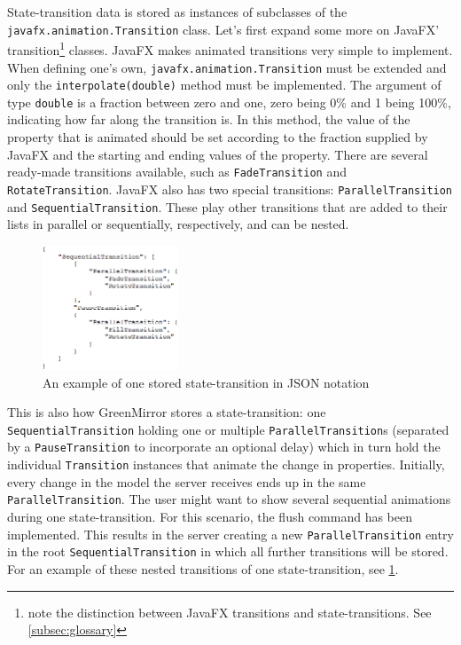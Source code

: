 \documentclass[a4paper]{article}
\begin{document}
State-transition data is stored as instances of subclasses of the \lstinline{javafx.animation.Transition} class. Let's first expand some more on JavaFX' transition\footnote{note the distinction between JavaFX transitions and state-transitions. See \cref{subsec:glossary}} classes. JavaFX makes animated transitions very simple to implement. When defining one's own, \lstinline{javafx.animation.Transition} must be extended and only the \lstinline{interpolate(double)} method must be implemented. The argument of type \lstinline{double} is a fraction between zero and one, zero being 0\% and 1 being 100\%, indicating how far along the transition is. In this method, the value of the property that is animated should be set according to the fraction supplied by JavaFX and the starting and ending values of the property. There are several ready-made transitions available, such as \lstinline{FadeTransition} and \lstinline{RotateTransition}. JavaFX also has two special transitions: \lstinline{ParallelTransition} and \lstinline{SequentialTransition}. These play other transitions that are added to their lists in parallel or sequentially, respectively, and can be nested.

\begin{figure}\vspace{-20pt}
  \begin{center}
    \includegraphics[width=0.36\textwidth]{diagrams/transitiontree}
  \end{center}
  \vspace{-10pt}\caption{An example of one stored state-transition in JSON notation}\vspace{-12pt}
  \label{fig:transitiontree}
\end{figure}
This is also how GreenMirror stores a state-transition: one \lstinline{SequentialTransition} holding one or multiple \lstinline{ParallelTransition}s (separated by a \lstinline{PauseTransition} to incorporate an optional delay) which in turn hold the individual \lstinline{Transition} instances that animate the change in properties. Initially, every change in the model the server receives ends up in the same \lstinline{ParallelTransition}. The user might want to show several sequential animations during one state-transition. For this scenario, the flush command has been implemented. This results in the server creating a new \lstinline{ParallelTransition} entry in the root \lstinline{SequentialTransition} in which all further transitions will be stored. For an example of these nested transitions of one state-transition, see \cref{fig:transitiontree}.
\end{document}
